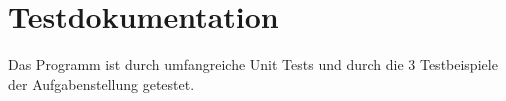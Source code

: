 \chapter{Testdokumentation}
\label{chap:Testdokumentation}

Das Programm ist durch umfangreiche Unit Tests und durch die 3 Testbeispiele der Aufgabenstellung getestet.